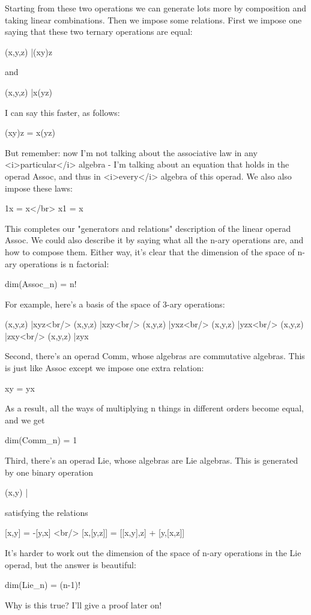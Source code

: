 Starting from these two operations we can generate lots more by
composition and taking linear combinations.  Then we impose some
relations.  First we impose one saying that these two ternary
operations are equal:

(x,y,z) |\to  (xy)z

and

(x,y,z) |\to  x(yz)

I can say this faster, as follows:

(xy)z = x(yz)

But remember: now I'm not talking about the associative law in any
<i>particular</i> algebra - I'm talking about an equation that holds
in the operad Assoc, and thus in <i>every</i> algebra of this operad.
We also also impose these laws:

1x = x</br>
x1 = x

This completes our "generators and relations" description of
the linear operad Assoc.  We could also describe it by saying what all
the n-ary operations are, and how to compose them.  Either way, it's
clear that the dimension of the space of n-ary operations is n
factorial:

dim(Assoc_{n}) = n!

For example, here's a basis of the space of 3-ary operations:

(x,y,z) |\to  xyz<br/>
(x,y,z) |\to  xzy<br/>
(x,y,z) |\to  yxz<br/>
(x,y,z) |\to  yzx<br/>
(x,y,z) |\to  zxy<br/>
(x,y,z) |\to  zyx

Second, there's an operad Comm, whose algebras are commutative
algebras.  This is just like Assoc except we impose one extra
relation:

xy = yx

As a result, all the ways of multiplying n things in different orders
become equal, and we get

dim(Comm_{n}) = 1

Third, there's an operad Lie, whose algebras are Lie algebras.
This is generated by one binary operation

(x,y) |\to  [x,y]

satisfying the relations

[x,y] = -[y,x] <br/>
[x,[y,z]] = [[x,y],z] + [y,[x,z]]

It's harder to work out the dimension of the space of n-ary operations
in the Lie operad, but the answer is beautiful:

dim(Lie_{n}) = (n-1)!

Why is this true?  I'll give a proof later on! 

